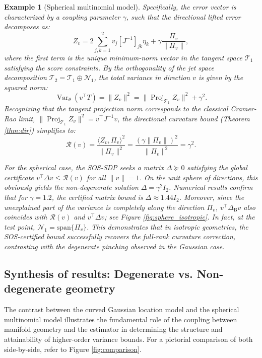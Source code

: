 \documentclass[pdflatex,sn-mathphys-num]{sn-jnl}%
\theoremstyle{thmstyleone}%
\theoremstyle{thmstyletwo}%
\newtheorem{example}{Example}%
\theoremstyle{thmstylethree}%
\begin{document}
\begin{example}[Spherical multinomial model]
Specifically, the error vector is characterized by a coupling parameter $\gamma$, such that the directional lifted error decomposes as: 
$$Z_v = 2\sum_{j,k=1}^2 v_j [J^{-1}]_{jk} \eta_k + \gamma \frac{\Pi_v}{\|\Pi_v\|},$$ 
where the first term is the unique minimum-norm vector in the tangent space $\mathcal{T}_1$ satisfying the score constraints. By the orthogonality of the jet space decomposition $\mathcal{T}_2 = \mathcal{T}_1 \oplus \mathcal{N}_1$, the total variance in direction $v$ is given by the squared norm:
$$\operatorname{Var}_{\theta}(v^\top T) = \|Z_v\|^2 = \|\operatorname{Proj}_{\mathcal{T}_1} Z_v\|^2 + \gamma^2.$$
Recognizing that the tangent projection norm corresponds to the classical Cramer-Rao limit, $\|\operatorname{Proj}_{\mathcal{T}_1} Z_v\|^2 =  v^\top J^{-1} v$, the directional curvature bound (Theorem \ref{thm:dir}) simplifies to:$$\mathcal{R}(v) = \frac{\langle Z_v, \Pi_v \rangle^2}{\|\Pi_v\|^2} = \frac{(\gamma \|\Pi_v\|)^2}{\|\Pi_v\|^2} = \gamma^2.$$

For the spherical case, the SOS-SDP seeks a matrix $\Delta \succeq 0$ satisfying the global certificate $v^\top \Delta v \le \mathcal{R}(v)$ for all $\|v\|=1$. On the unit sphere of directions, this obviously yields the non-degenerate solution $\Delta = \gamma^2 I_2$. Numerical results confirm that for $\gamma = 1.2$, the certified matrix bound is $\Delta \approx 1.44 I_2$. Moreover, since the unexplained part of the variance is completely along the direction \(\Pi_v\), \(v^\top\Delta_{\mathrm{B}}v\) also coincides with \(\mathcal{R}(v)\) and \(v^\top \Delta v\); see Figure \ref{fig:sphere_isotropic}. In fact, at the test point, \(\mathcal{N}_1=\mathrm{span}\{\Pi_v\}\). This demonstrates that in isotropic geometries, the SOS-certified bound successfully recovers the full-rank curvature correction, contrasting with the degenerate pinching observed in the Gaussian case.
\end{example}

\subsection{Synthesis of results: Degenerate vs. Non-degenerate geometry}
\label{sec:syn}
The contrast between the curved Gaussian location model and the spherical multinomial model illustrates the fundamental role of the coupling between manifold geometry and the estimator in determining the structure and attainability of higher-order variance bounds. For a pictorial comparison of both side-by-side, refer to Figure \ref{fig:comparison}.
\end{document}
